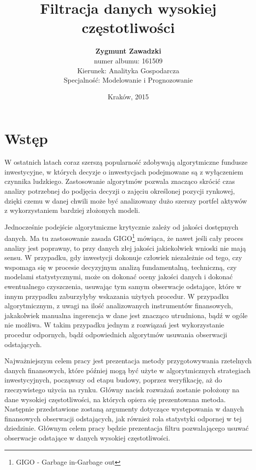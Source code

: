\documentclass[a4paper,12pt,openany, DIV=calc, headsepline]{scrbook}
\author{{\LARGE \textbf{Zygmunt Zawadzki}}\\
numer albumu: 161509\\
Kierunek: Analityka Gospodarcza\\
Specjalność: Modelowanie i Prognozowanie}
\title{Filtracja danych wysokiej częstotliwości}
\date{Kraków, 2015}
\begin{document}
\maketitle

\tableofcontents
\chapter*{Wstęp}


W ostatnich latach coraz szerszą popularność zdobywają algorytmiczne fundusze inwestycyjne, w których decyzje o inwestycjach podejmowane są z wyłączeniem czynnika ludzkiego. Zastosowanie algorytmów pozwala znacząco skrócić czas analizy potrzebnej do podjęcia decyzji o zajęciu określonej pozycji rynkowej, dzięki czemu w danej chwili może być analizowany dużo szerszy portfel aktywów z wykorzystaniem bardziej złożonych modeli. 

Jednocześnie podejście algorytmiczne krytycznie zależy od jakości dostępnych danych. Ma tu zastosowanie zasada GIGO\footnote{GIGO - Garbage in-Garbage out} mówiąca, że nawet jeśli cały proces analizy jest poprawny, to przy danych złej jakości jakiekolwiek wnioski nie mają sensu. W przypadku, gdy inwestycji dokonuje człowiek niezależnie od tego, czy wspomaga się w procesie decyzyjnym analizą fundamentalną, techniczną, czy modelami statystycznymi, może on dokonać oceny jakości danych i dokonać ewentualnego czyszczenia, usuwając tym samym obserwacje odstające, które w innym przypadku zaburzyłyby wskazania użytych procedur. W przypadku algorytmicznym, z uwagi na ilość analizowanych instrumentów finansowych, jakakolwiek manualna ingerencja w dane jest znacząco utrudniona, bądź w ogóle nie możliwa. W takim przypadku jednym z rozwiązań jest wykorzystanie procedur odpornych, bądź odpowiednich algorytmów usuwania obserwacji odstających.

Najważniejszym celem pracy jest prezentacja metody przygotowywania rzetelnych danych finansowych, które później mogą być użyte w algorytmicznych strategiach inwestycyjnych, począwszy od etapu budowy, poprzez weryfikację, aż do rzeczywistego użycia na rynku. Główny nacisk rozważań zostanie położony na dane wysokiej częstotliwości, na których opiera się prezentowana metoda. Następnie przedstawione zostaną argumenty dotyczące występowania w danych finansowych obserwacji odstających, jak również rola statystyki odpornej w tej dziedzinie. Głównym celem pracy będzie prezentacja filtru pozwalającego usuwać obserwacje odstające w danych wysokiej częstotliwości.
\end{document}
